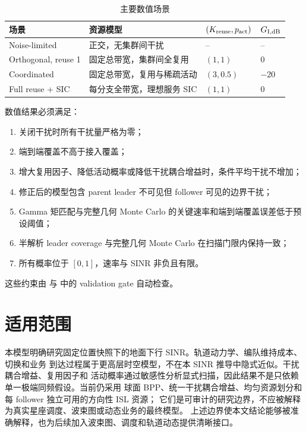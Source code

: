 \documentclass[UTF8,a4paper,11pt]{ctexart}
\begin{document}
\begin{table}[htbp]
\centering
\caption{主要数值场景}
\begin{tabular}{llll}
\toprule
场景 & 资源模型 & $(K_{\rm reuse},p_{\rm act})$ & $G_{\rm I,dB}$\\
\midrule
Noise-limited & 正交，无集群间干扰 & -- & --\\
Orthogonal, reuse 1 & 固定总带宽，集群间全复用 & $(1,1)$ & $0$\\
Coordinated & 固定总带宽，复用与稀疏活动 & $(3,0.5)$ & $-20$\\
Full reuse + SIC & 每分支全带宽，理想服务 SIC & $(1,1)$ & $0$\\
\bottomrule
\end{tabular}
\end{table}

数值结果必须满足：
\begin{enumerate}[leftmargin=2em]
  \item 关闭干扰时所有干扰量严格为零；
  \item 端到端覆盖不高于接入覆盖；
  \item 增大复用因子、降低活动概率或降低干扰耦合增益时，条件平均干扰不增加；
  \item 修正后的模型包含 parent leader 不可见但 follower 可见的边界干扰；
  \item Gamma 矩匹配与完整几何 Monte Carlo 的关键速率和端到端覆盖误差低于预设阈值；
  \item 半解析 leader coverage 与完整几何 Monte Carlo 在扫描门限内保持一致；
  \item 所有概率位于 $[0,1]$，速率与 SINR 非负且有限。
\end{enumerate}

这些约束由  与
 中的 validation gate 自动检查。

\section{适用范围}

本模型明确研究固定位置快照下的地面下行 SINR。轨道动力学、编队维持成本、切换和业务
到达过程属于更高层时空模型，不在本 SINR 推导中隐式近似。干扰耦合增益、复用因子和
活动概率通过敏感性分析显式扫描，因此结果不是只依赖单一极端同频假设。当前仍采用
球面 BPP、统一干扰耦合增益、均匀资源划分和每 follower 独立可用的方向性 ISL 资源；
它们是可审计的研究边界，不应被解释为真实星座调度、波束图或动态业务的最终模型。
上述边界使本文结论能够被准确解释，也为后续加入波束图、调度和轨道动态提供清晰接口。
\end{document}
